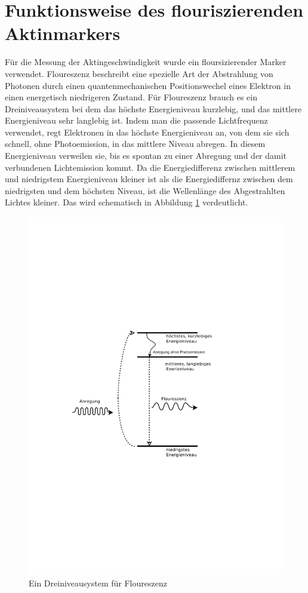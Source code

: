 \section{Funktionsweise des flouriszierenden Aktinmarkers}
Für die Messung der Aktingeschwindigkeit wurde ein floursizierender Marker verwendet.
Floureszenz beschreibt eine spezielle Art der Abstrahlung von
Photonen durch einen quantenmechanischen Positionswechel
eines Elektron in einen energetisch niedrigeren Zustand.
Für Floureszenz brauch es ein Dreiniveausystem bei dem das
höchste Energieniveau kurzlebig, und das mittlere Energieniveau
sehr langlebig ist. Indem man die passende Lichtfrequenz verwendet,
regt Elektronen in das höchste Energieniveau an,
von dem sie sich schnell, ohne Photoemission, in das mittlere Niveau abregen.
In diesem Energieniveau verweilen sie, bis es spontan zu einer 
Abregung und der damit verbundenen Lichtemission kommt.
Da die Energiedifferenz zwischen mittlerem und niedrigstem Energieniveau kleiner ist als
die Energiediffernz zwischen dem niedrigsten und dem höchsten Niveau, ist die Wellenlänge
des Abgestrahlten Lichtes kleiner. Das wird schematisch in Abbildung
\ref{fig:dreiniveausystem} verdeutlicht.

\begin{figure}[]
  \centering
  \includegraphics[width=\textwidth]{bilder/energieniveauschema.pdf}
  \caption{Ein Dreiniveausystem für Floureszenz}
  \label{fig:dreiniveausystem}
\end{figure}

